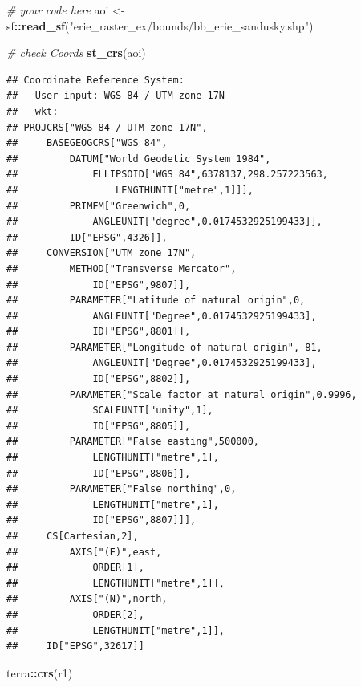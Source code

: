 \documentclass[
]{article}
\newenvironment{Shaded}{\begin{snugshade}}{\end{snugshade}}
\newcommand{\CommentTok}[1]{\textcolor[rgb]{0.56,0.35,0.01}{\textit{#1}}}
\newcommand{\FunctionTok}[1]{\textcolor[rgb]{0.13,0.29,0.53}{\textbf{#1}}}
\newcommand{\NormalTok}[1]{#1}
\newcommand{\OtherTok}[1]{\textcolor[rgb]{0.56,0.35,0.01}{#1}}
\newcommand{\SpecialCharTok}[1]{\textcolor[rgb]{0.81,0.36,0.00}{\textbf{#1}}}
\newcommand{\StringTok}[1]{\textcolor[rgb]{0.31,0.60,0.02}{#1}}
\begin{document}
\begin{Shaded}
\begin{Highlighting}[]
\CommentTok{\# your code here}
\NormalTok{aoi }\OtherTok{\textless{}{-}}\NormalTok{ sf}\SpecialCharTok{::}\FunctionTok{read\_sf}\NormalTok{(}\StringTok{"erie\_raster\_ex/bounds/bb\_erie\_sandusky.shp"}\NormalTok{)}

\CommentTok{\# check Coords}
\FunctionTok{st\_crs}\NormalTok{(aoi)}
\end{Highlighting}
\end{Shaded}

\begin{verbatim}
## Coordinate Reference System:
##   User input: WGS 84 / UTM zone 17N 
##   wkt:
## PROJCRS["WGS 84 / UTM zone 17N",
##     BASEGEOGCRS["WGS 84",
##         DATUM["World Geodetic System 1984",
##             ELLIPSOID["WGS 84",6378137,298.257223563,
##                 LENGTHUNIT["metre",1]]],
##         PRIMEM["Greenwich",0,
##             ANGLEUNIT["degree",0.0174532925199433]],
##         ID["EPSG",4326]],
##     CONVERSION["UTM zone 17N",
##         METHOD["Transverse Mercator",
##             ID["EPSG",9807]],
##         PARAMETER["Latitude of natural origin",0,
##             ANGLEUNIT["Degree",0.0174532925199433],
##             ID["EPSG",8801]],
##         PARAMETER["Longitude of natural origin",-81,
##             ANGLEUNIT["Degree",0.0174532925199433],
##             ID["EPSG",8802]],
##         PARAMETER["Scale factor at natural origin",0.9996,
##             SCALEUNIT["unity",1],
##             ID["EPSG",8805]],
##         PARAMETER["False easting",500000,
##             LENGTHUNIT["metre",1],
##             ID["EPSG",8806]],
##         PARAMETER["False northing",0,
##             LENGTHUNIT["metre",1],
##             ID["EPSG",8807]]],
##     CS[Cartesian,2],
##         AXIS["(E)",east,
##             ORDER[1],
##             LENGTHUNIT["metre",1]],
##         AXIS["(N)",north,
##             ORDER[2],
##             LENGTHUNIT["metre",1]],
##     ID["EPSG",32617]]
\end{verbatim}

\begin{Shaded}
\begin{Highlighting}[]
\NormalTok{terra}\SpecialCharTok{::}\FunctionTok{crs}\NormalTok{(r1)}
\end{Highlighting}
\end{Shaded}
\end{document}
